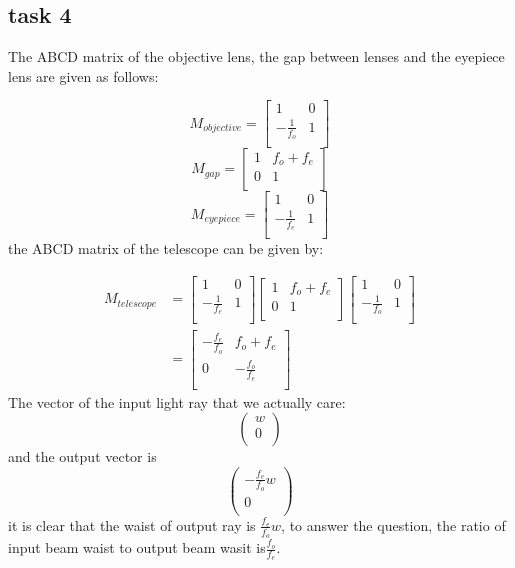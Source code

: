 \documentclass{article}
\begin{document}
\subsection{task 4}
{The ABCD matrix of the objective lens, the gap between lenses and the eyepiece lens are given as follows:}\par
$$
M_{objective}=
\left[ {\begin{array}{cc}
    1 & 0 \\
    -\frac{1}{f_o} & 1 \\
\end{array} } \right]
$$
$$
M_{gap}=
\left[ {\begin{array}{cc}
    1 & f_o + f_e \\
    0 & 1 \\
\end{array} } \right]
$$
$$
M_{eyepiece}=
\left[ {\begin{array}{cc}
    1 & 0 \\
    -\frac{1}{f_e} & 1 \\
\end{array} } \right]
$$
{the ABCD matrix of the telescope can be given by:}\par
\begin{equation}
    \begin{split}
        M_{telescope} &=
        \left[ {\begin{array}{cc}
            1 & 0 \\
            -\frac{1}{f_e} & 1 \\
        \end{array} } \right]
        \left[ {\begin{array}{cc}
            1 & f_o + f_e \\
            0 & 1 \\
        \end{array} } \right]
        \left[ {\begin{array}{cc}
            1 & 0 \\
            -\frac{1}{f_o} & 1 \\
        \end{array} } \right]\\
        &=
        \left[ {\begin{array}{cc}
            -\frac{f_e}{f_o} & f_o + f_e \\
            0 & -\frac{f_o}{f_e} \\
        \end{array} } \right]
    \end{split}
\end{equation}
{The vector of the input light ray that we actually care:
\[
\begin{pmatrix}
w\\
0\\
\end{pmatrix}
\]
and the output vector is
\[
\begin{pmatrix}
-\frac{f_e}{f_o}w\\
0\\
\end{pmatrix}
\]
it is clear that the waist of output ray is $\frac{f_e}{f_o}w$, to answer the question, the ratio of input 
beam waist to output beam wasit is$\frac{f_o}{f_e}$.}
\end{document}
